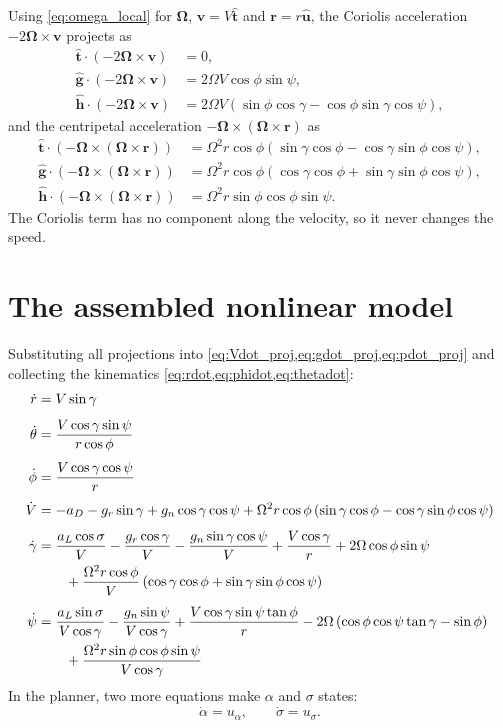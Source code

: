 \documentclass[11pt]{report}
\numberwithin{equation}{chapter}
\newcommand{\uh}{\hat{\mathbf u}}
\newcommand{\tth}{\hat{\mathbf t}}
\newcommand{\gh}{\hat{\mathbf g}}
\newcommand{\hh}{\hat{\mathbf h}}
\newcommand{\vb}[1]{\bm{#1}}
\newcommand{\aL}{a_L}
\newcommand{\aD}{a_D}
\begin{document}
Using \cref{eq:omega_local} for $\vb\Omega$, $\vb v = V\tth$ and $\vb r = r\uh$, the
Coriolis acceleration $-2\vb\Omega\times\vb v$ projects as
\begin{align}
  \tth\cdot\left(-2\vb\Omega\times\vb v\right) &= 0, \\
  \gh\cdot\left(-2\vb\Omega\times\vb v\right) &= 2\Omega V\cos\phi\sin\psi, \\
  \hh\cdot\left(-2\vb\Omega\times\vb v\right) &= 2\Omega V\left(\sin\phi\cos\gamma - \cos\phi\sin\gamma\cos\psi\right),
\end{align}
and the centripetal acceleration $-\vb\Omega\times(\vb\Omega\times\vb r)$ as
\begin{align}
  \tth\cdot\left(-\vb\Omega\times(\vb\Omega\times\vb r)\right)
    &= \Omega^2 r\cos\phi\left(\sin\gamma\cos\phi - \cos\gamma\sin\phi\cos\psi\right), \\
  \gh\cdot\left(-\vb\Omega\times(\vb\Omega\times\vb r)\right)
    &= \Omega^2 r\cos\phi\left(\cos\gamma\cos\phi + \sin\gamma\sin\phi\cos\psi\right), \\
  \hh\cdot\left(-\vb\Omega\times(\vb\Omega\times\vb r)\right)
    &= \Omega^2 r\sin\phi\cos\phi\sin\psi .
\end{align}
The Coriolis term has no component along the velocity, so it never changes the speed.

\section{The assembled nonlinear model}\label{sec:full_eom}

Substituting all projections into \cref{eq:Vdot_proj,eq:gdot_proj,eq:pdot_proj} and
collecting the kinematics \cref{eq:rdot,eq:phidot,eq:thetadot}:
\begin{align}
  \dot r &= V\sin\gamma \label{eq:full_r}\\[4pt]
  \dot\theta &= \frac{V\cos\gamma\sin\psi}{r\cos\phi} \\[4pt]
  \dot\phi &= \frac{V\cos\gamma\cos\psi}{r} \\[4pt]
  \dot V &= -\aD - g_r\sin\gamma + g_n\cos\gamma\cos\psi
            + \Omega^2 r\cos\phi\left(\sin\gamma\cos\phi - \cos\gamma\sin\phi\cos\psi\right) \\[4pt]
  \dot\gamma &= \frac{\aL\cos\sigma}{V} - \frac{g_r\cos\gamma}{V} - \frac{g_n\sin\gamma\cos\psi}{V}
            + \frac{V\cos\gamma}{r} + 2\Omega\cos\phi\sin\psi \notag\\
         &\qquad + \frac{\Omega^2 r\cos\phi}{V}\left(\cos\gamma\cos\phi + \sin\gamma\sin\phi\cos\psi\right) \\[4pt]
  \dot\psi &= \frac{\aL\sin\sigma}{V\cos\gamma} - \frac{g_n\sin\psi}{V\cos\gamma}
            + \frac{V\cos\gamma\sin\psi\tan\phi}{r}
            - 2\Omega\left(\cos\phi\cos\psi\tan\gamma - \sin\phi\right) \notag\\
         &\qquad + \frac{\Omega^2 r\sin\phi\cos\phi\sin\psi}{V\cos\gamma} \label{eq:full_psi}
\end{align}
In the planner, two more equations make $\alpha$ and $\sigma$ states:
\begin{equation}
  \dot\alpha = u_\alpha,\qquad \dot\sigma = u_\sigma .
\end{equation}
\end{document}
